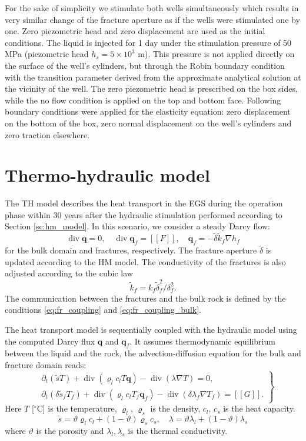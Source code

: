 \documentclass{article}
\renewcommand{\div}{\operatorname{div}}
\newcommand{\eq}[1]{\begin{equation}#1\end{equation}}
\newcommand{\jmp}[1]{[\![#1]\!]}
\newcommand{\vc}[1]{\boldsymbol{#1}}
\newcommand{\degC}{$^\circ\mathrm{C}$}
\begin{document}
For the sake of simplicity we stimulate both wells simultaneously which results in very similar change of the fracture aperture as if the wells were stimulated one by one. Zero piezometric head and zero displacement are used as the initial conditions. The liquid is injected for 1 day under the stimulation pressure of 50 MPa (piezometric head $h_s=5\times10^3$ m). This pressure is not applied directly on the surface of the well's cylinders, but through the Robin boundary condition with the transition parameter derived from the approximate analytical solution at the vicinity of the well. The zero piezometric head is prescribed on the box sides, while the no flow condition is applied on the top and bottom face. Following boundary conditions were applied for the elasticity equation: zero displacement on the bottom of the box, zero normal displacement on the well's cylinders and zero traction elsewhere.

\section{Thermo-hydraulic model}
The TH model describes the heat transport in the EGS during the operation phase within 30 years after the hydraulic stimulation performed according to Section \ref{sc:hm_model}. In this scenario, we consider a steady Darcy flow: 
\eq{ \label{th_darcy}
    \div \vc q = 0, \quad \div  \vc q_f =  \jmp F,\quad
    \vc q_f = -\tilde\delta \tilde k_f \nabla h_f
}
for the bulk domain and fractures, respectively. The fracture aperture $\tilde \delta$ is updated according to the HM model.
The conductivity of the fractures is also adjusted according to the cubic law 
\eq{ \label{eqn:cubic_law}
\tilde k_f = k_f\tilde\delta_f^2 / \delta_f^2.
}
The communication between the fractures and the bulk rock is defined by the conditions \eqref{eq:fr_coupling} and \eqref{eq:fr_coupling_bulk}.

The heat transport model is sequentially coupled with the hydraulic model using the computed Darcy flux $\vc q$ and $\vc q_f$. It assumes thermodynamic equilibrium between the liquid and the rock, the advection-diffusion equation for the bulk and fracture domain reads:
\eq{
\left.\begin{aligned}
&\partial_t\left(\tilde s T \right) + \div(\varrho_l c_l T \vc q) - \div(\lambda\nabla T) = 0,\\
&\partial_t\left(\delta \tilde s_f T_f \right) + \div(\varrho_l c_l T_f \vc q_f) - \div(\delta\lambda_f\nabla T_f) = \jmp{G}.
\end{aligned}\right\}
}
Here $T$ [\degC] is the temperature, $\varrho_l$, $\varrho_s$ is the density, $c_l$, $c_s$ is the heat capacity.
\eq{
\tilde s = \vartheta \varrho_l c_l + (1-\vartheta)\varrho_s c_s,\quad 
\lambda= \vartheta \lambda_l + (1-\vartheta)\lambda_s
}
where $\vartheta$ is the porosity and $\lambda_l,\lambda_s$ is the thermal conductivity.
\end{document}
